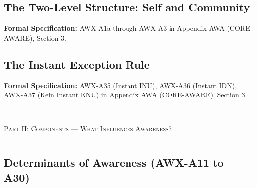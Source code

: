 \subsection{The Two-Level Structure: Self and Community}
\label{subsec:11-5-two-level}



\begin{cross-reference}
\textbf{Formal Specification:} AWX-A1a through AWX-A3 in
Appendix AWA (CORE-AWARE), Section 3.
\end{cross-reference}

\subsection{The Instant Exception Rule}
\label{subsec:11-6-instant-exception}



\begin{cross-reference}
\textbf{Formal Specification:} AWX-A35 (Instant INU), AWX-A36 (Instant IDN),
AWX-A37 (Kein Instant KNU) in Appendix AWA (CORE-AWARE), Section 3.
\end{cross-reference}



\begin{center}
\rule{0.8\textwidth}{0.4pt}\\[0.5em]
{\large\textsc{Part II: Components --- What Influences Awareness?}}\\[0.3em]
\rule{0.8\textwidth}{0.4pt}
\end{center}

\subsection{Determinants of Awareness (AWX-A11 to A30)}
\label{subsec:11-7-determinants}

